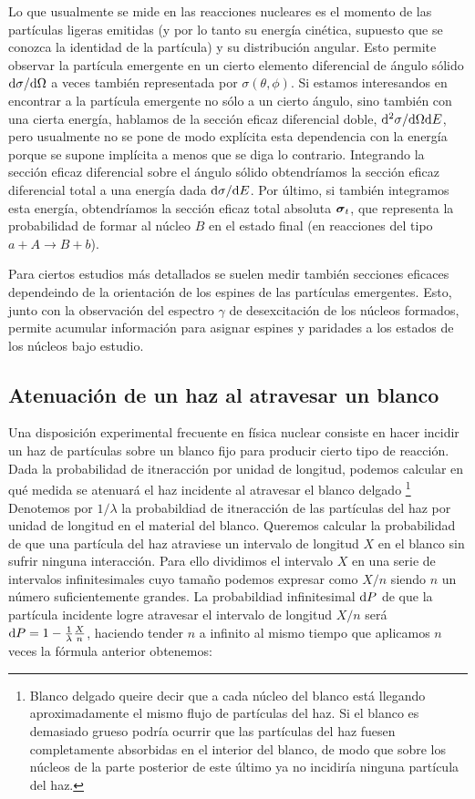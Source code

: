 Lo que usualmente se mide en las reacciones nucleares es el momento de las partículas ligeras emitidas (y por lo tanto su energía cinética, supuesto que se conozca la identidad de la partícula) y su distribución angular. Esto permite observar la partícula emergente en un cierto elemento diferencial de ángulo sólido $\mathrm{d} \sigma / \mathrm{d} \Omega$ a veces también representada por $\sigma (\theta, \phi)$. Si estamos interesandos en encontrar a la partícula emergente no sólo a un cierto ángulo, sino también con una cierta energía, hablamos de la sección eficaz diferencial doble, $\mathrm{d}^2 \sigma / \mathrm{d} \Omega \mathrm{d} E$, pero usualmente no se pone de modo explícita esta dependencia con la energía porque se supone implícita a menos que se diga lo contrario. Integrando la sección eficaz diferencial sobre el ángulo sólido obtendríamos la sección eficaz diferencial total a una energía dada $\mathrm{d} \sigma / \mathrm{d} E$. Por último, si también integramos esta energía, obtendríamos la sección eficaz total absoluta $\boldsymbol{\sigma}_t$, que representa la probabilidad de formar al núcleo $B$ en el estado final (en reacciones del tipo $a+A\longrightarrow B + b$). 

Para ciertos estudios más detallados se suelen medir también secciones eficaces dependeindo de la orientación de los espines de las partículas emergentes. Esto, junto con la observación del espectro $\gamma$ de desexcitación de los núcleos formados, permite acumular información para asignar espines y paridades a los estados de los núcleos bajo estudio.

\subsection{Atenuación de un haz al atravesar un blanco}

Una disposición experimental frecuente en física nuclear consiste en hacer incidir un haz de partículas sobre un blanco fijo para producir cierto tipo de reacción. Dada la probabilidad de itneracción por unidad de longitud, podemos calcular en qué medida se atenuará el haz incidente al atravesar el blanco delgado \footnote{Blanco delgado queire decir que a cada núcleo del blanco está llegando aproximadamente el mismo flujo de partículas del haz. Si el blanco es demasiado grueso podría ocurrir que las partículas del haz fuesen completamente absorbidas en el interior del blanco, de modo que sobre los núcleos de la parte posterior de este último ya no incidiría ninguna partícula del haz.} Denotemos por $1/\lambda$ la probabildiad de itneracción de las partículas del haz por unidad de longitud en el material del blanco. Queremos calcular la probabilidad de que una partícula del haz atraviese un intervalo de longitud $X$ en el blanco sin sufrir ninguna interacción. Para ello dividimos el intervalo $X$ en una serie de intervalos infinitesimales cuyo tamaño podemos expresar como $X/n$ siendo $n$ un número suficientemente grandes. La probabildiad infinitesimal $\mathrm{d} P$ de que la partícula incidente logre atravesar el intervalo de longitud $X/n$ será $\mathrm{d} P = 1 - \frac{1}{\lambda} \frac{X}{n}$, haciendo tender $n$ a infinito al mismo tiempo que aplicamos $n$ veces la fórmula anterior obtenemos:  

